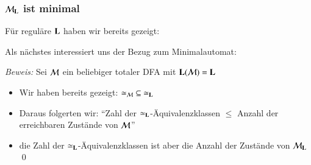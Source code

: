 \documentclass[onlymath]{beamer}
\begin{document}
\begin{frame}[t]\frametitle{$\mathcal{M}_{\textbf{\textcolor{black}{L}}}$ ist minimal}

Für reguläre $\textbf{\textcolor{black}{L}}$ haben wir bereits gezeigt:
%
\medskip

Als nächstes interessiert uns der Bezug zum Minimalautomat\pause:

\pause

\emph{Beweis:} Sei $\mathcal{M}$ ein beliebiger totaler DFA mit $\textbf{\textcolor{black}{L}}(\mathcal{M})=\textbf{\textcolor{black}{L}}$
\begin{itemize}
\item Wir haben bereits gezeigt: ${\simeq_{\mathcal{M}}}\subseteq{\simeq_{\textbf{\textcolor{black}{L}}}}$
\item Daraus folgerten wir: "`Zahl der $\simeq_{\textbf{\textcolor{black}{L}}}$-Äquivalenzklassen $\leq$ Anzahl der erreichbaren Zustände von $\mathcal{M}$"'
\item die Zahl der $\simeq_{\textbf{\textcolor{black}{L}}}$-Äquivalenzklassen ist aber die Anzahl der Zustände von $\mathcal{M}_{\textbf{\textcolor{black}{L}}}$\qed
\end{itemize}

\end{frame}
\end{document}
